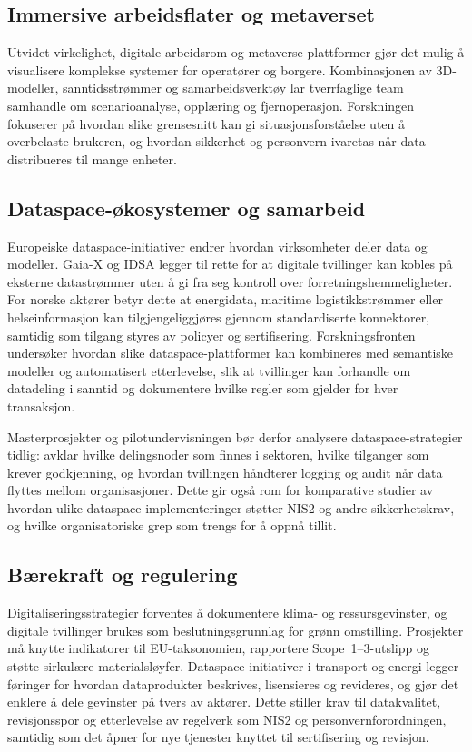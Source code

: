 \subsection{Immersive arbeidsflater og metaverset}
Utvidet virkelighet, digitale arbeidsrom og metaverse-plattformer gjør det mulig å visualisere komplekse systemer for operatører og borgere. Kombinasjonen av 3D-modeller, sanntidsstrømmer og samarbeidsverktøy lar tverrfaglige team samhandle om scenarioanalyse, opplæring og fjernoperasjon. Forskningen fokuserer på hvordan slike grensesnitt kan gi situasjonsforståelse uten å overbelaste brukeren, og hvordan sikkerhet og personvern ivaretas når data distribueres til mange enheter.

\subsection{Dataspace-økosystemer og samarbeid}
Europeiske dataspace-initiativer endrer hvordan virksomheter deler data og modeller. Gaia-X og IDSA legger til rette for at digitale tvillinger kan kobles på eksterne datastrømmer uten å gi fra seg kontroll over forretningshemmeligheter.\citep{gaiax2022architecture,idsa2023ram} For norske aktører betyr dette at energidata, maritime logistikkstrømmer eller helseinformasjon kan tilgjengeliggjøres gjennom standardiserte konnektorer, samtidig som tilgang styres av policyer og sertifisering. Forskningsfronten undersøker hvordan slike dataspace-plattformer kan kombineres med semantiske modeller og automatisert etterlevelse, slik at tvillinger kan forhandle om datadeling i sanntid og dokumentere hvilke regler som gjelder for hver transaksjon.

Masterprosjekter og pilotundervisningen bør derfor analysere dataspace-strategier tidlig: avklar hvilke delingsnoder som finnes i sektoren, hvilke tilganger som krever godkjenning, og hvordan tvillingen håndterer logging og audit når data flyttes mellom organisasjoner. Dette gir også rom for komparative studier av hvordan ulike dataspace-implementeringer støtter NIS2 og andre sikkerhetskrav, og hvilke organisatoriske grep som trengs for å oppnå tillit.\citep{rcn2024digitalisering}

\subsection{Bærekraft og regulering}
Digitaliseringsstrategier forventes å dokumentere klima- og ressursgevinster, og digitale tvillinger brukes som beslutningsgrunnlag for grønn omstilling. Prosjekter må knytte indikatorer til EU-taksonomien, rapportere Scope~1--3-utslipp og støtte sirkulære materialsløyfer. Dataspace-initiativer i transport og energi legger føringer for hvordan dataprodukter beskrives, lisensieres og revideres, og gjør det enklere å dele gevinster på tvers av aktører.\citep{ec2023mobilitydataspace} Dette stiller krav til datakvalitet, revisjonsspor og etterlevelse av regelverk som NIS2 og personvernforordningen, samtidig som det åpner for nye tjenester knyttet til sertifisering og revisjon.

